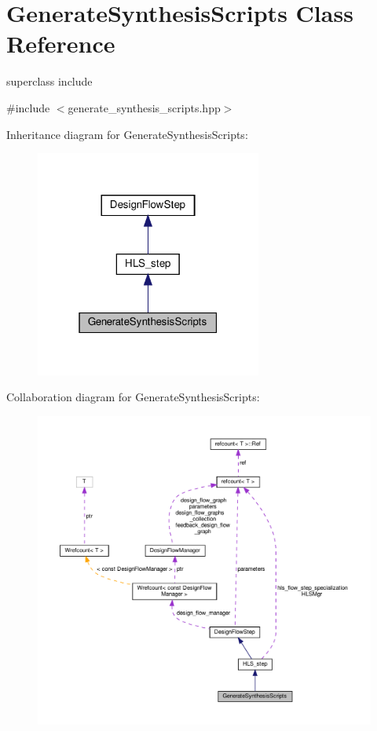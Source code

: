\hypertarget{classGenerateSynthesisScripts}{}\section{Generate\+Synthesis\+Scripts Class Reference}
\label{classGenerateSynthesisScripts}


superclass include  




{\ttfamily \#include $<$generate\+\_\+synthesis\+\_\+scripts.\+hpp$>$}



Inheritance diagram for Generate\+Synthesis\+Scripts\+:
\nopagebreak
\begin{figure}[H]
\begin{center}
\leavevmode
\includegraphics[width=211pt]{d4/d2a/classGenerateSynthesisScripts__inherit__graph}
\end{center}
\end{figure}


Collaboration diagram for Generate\+Synthesis\+Scripts\+:
\nopagebreak
\begin{figure}[H]
\begin{center}
\leavevmode
\includegraphics[width=350pt]{d5/d21/classGenerateSynthesisScripts__coll__graph}
\end{center}
\end{figure}
